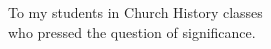 \begin{dedication}
To my students in Church History classes\\
who pressed the question of significance.
\end{dedication}
